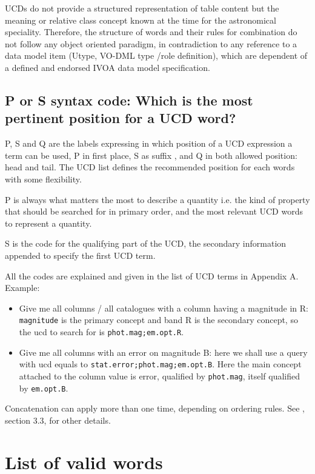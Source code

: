 \documentclass[11pt,a4paper]{ivoa}
\begin{document}
UCDs do not provide a structured representation of table content but the meaning or relative class 
concept known at the time for the astronomical speciality. Therefore, the structure of words and 
their rules for combination do not follow any object oriented paradigm, in contradiction to any 
reference to a data model item (Utype, VO-DML type /role definition), which are dependent of a 
defined and endorsed IVOA data model specification.

\subsection{P or S syntax code: Which is the most pertinent position for a UCD word?}
P, S and Q are the labels expressing in which position of a UCD expression a term can be used, P 
in first place, S as suffix , and Q in both allowed position: head and tail. The UCD list defines 
the recommended position for each words with some flexibility.

P is always what matters the most to describe a quantity i.e. the kind of property that should be 
searched for in primary order, and the most relevant UCD words to represent a quantity.

S is the code for the qualifying part of the UCD, the secondary information appended to specify 
the first UCD term.

All the codes are explained and given in the list of UCD terms in Appendix A. Example:
\begin{itemize}
\item Give me all columns / all catalogues with a column having a magnitude in R: {\tt magnitude} 
is the primary concept and band R is the secondary concept, so the ucd to search for is 
{\tt phot.mag;em.opt.R}.
\item Give me all columns with an error on magnitude B: here we shall use a query with ucd 
equals to {\tt stat.error;phot.mag;em.opt.B}. Here the main concept attached to the column 
value is error, qualified by {\tt phot.mag}, itself qualified by {\tt em.opt.B}.
\end{itemize}
Concatenation can apply more than one time, depending on ordering rules. See \citet{std:UCD}, section 3.3, 
for other details.

\section{List of valid words}
\label{sec:list}
\end{document}
